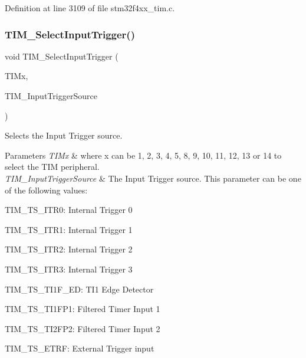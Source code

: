 Definition at line 3109 of file stm32f4xx\+\_\+tim.\+c.

\mbox{\label{group___t_i_m_ga4252583c6ae8a73d6fc66f7e951dbc35}} 
\subsubsection{\texorpdfstring{T\+I\+M\+\_\+\+Select\+Input\+Trigger()}{TIM\_SelectInputTrigger()}}
{\footnotesize\ttfamily void T\+I\+M\+\_\+\+Select\+Input\+Trigger (\begin{DoxyParamCaption}\item[{\hyperlink{struct_t_i_m___type_def}{T\+I\+M\+\_\+\+Type\+Def} $\ast$}]{T\+I\+Mx,  }\item[{uint16\+\_\+t}]{T\+I\+M\+\_\+\+Input\+Trigger\+Source }\end{DoxyParamCaption})}



Selects the Input Trigger source. 


\begin{DoxyParams}{Parameters}
{\em T\+I\+Mx} & where x can be 1, 2, 3, 4, 5, 8, 9, 10, 11, 12, 13 or 14 to select the T\+IM peripheral. \\
\hline
{\em T\+I\+M\+\_\+\+Input\+Trigger\+Source} & The Input Trigger source. This parameter can be one of the following values\+: \begin{DoxyItemize}
\item T\+I\+M\+\_\+\+T\+S\+\_\+\+I\+T\+R0\+: Internal Trigger 0 \item T\+I\+M\+\_\+\+T\+S\+\_\+\+I\+T\+R1\+: Internal Trigger 1 \item T\+I\+M\+\_\+\+T\+S\+\_\+\+I\+T\+R2\+: Internal Trigger 2 \item T\+I\+M\+\_\+\+T\+S\+\_\+\+I\+T\+R3\+: Internal Trigger 3 \item T\+I\+M\+\_\+\+T\+S\+\_\+\+T\+I1\+F\+\_\+\+ED\+: T\+I1 Edge Detector \item T\+I\+M\+\_\+\+T\+S\+\_\+\+T\+I1\+F\+P1\+: Filtered Timer Input 1 \item T\+I\+M\+\_\+\+T\+S\+\_\+\+T\+I2\+F\+P2\+: Filtered Timer Input 2 \item T\+I\+M\+\_\+\+T\+S\+\_\+\+E\+T\+RF\+: External Trigger input \end{DoxyItemize}
\\
\hline
\end{DoxyParams}

